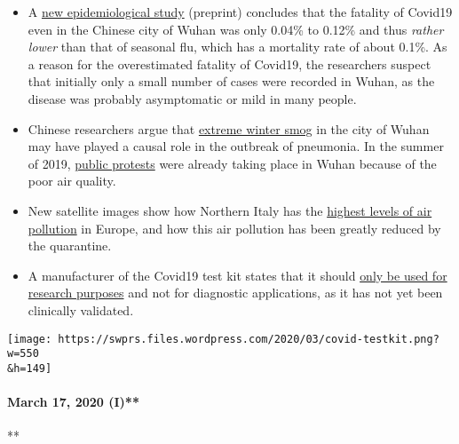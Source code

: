 \begin{itemize}
\tightlist
\item
  A
  \href{https://www.medrxiv.org/content/10.1101/2020.02.12.20022434v2}{new
  epidemiological study} (preprint) concludes that the fatality of
  Covid19 even in the Chinese city of Wuhan was only 0.04\% to 0.12\%
  and thus \emph{rather lower} than that of seasonal flu, which has a
  mortality rate of about 0.1\%. As a reason for the overestimated
  fatality of Covid19, the researchers suspect that initially only a
  small number of cases were recorded in Wuhan, as the disease was
  probably asymptomatic or mild in many people.
\item
  Chinese researchers argue that
  \href{https://www.eurasiareview.com/01022020-polluted-air-could-be-an-important-cause-of-wuhan-pneumonia-oped/}{extreme
  winter smog} in the city of Wuhan may have played a causal role in the
  outbreak of pneumonia. In the summer of 2019,
  \href{https://www.cnn.com/2019/07/10/asia/china-wuhan-pollution-problems-intl-hnk/index.html}{public
  protests} were already taking place in Wuhan because of the poor air
  quality.
\item
  New satellite images show how Northern Italy has the
  \href{https://twitter.com/esa/status/1238480433047916545}{highest
  levels of air pollution} in Europe, and how this air pollution has
  been greatly reduced by the quarantine.
\item
  A manufacturer of the Covid19 test kit states that it should
  \href{https://www.creative-diagnostics.com/sars-cov-2-coronavirus-multiplex-rt-qpcr-kit-277854-457.htm}{only
  be used for research purposes} and not for diagnostic applications, as
  it has not yet been clinically validated.
\end{itemize}

\texttt{[image: https://swprs.files.wordpress.com/2020/03/covid-testkit.png?w=550\\\&h=149]}

\hypertarget{march-17-2020-i}{%
\paragraph{March 17, 2020 (I)**}\label{march-17-2020-i}}

**

